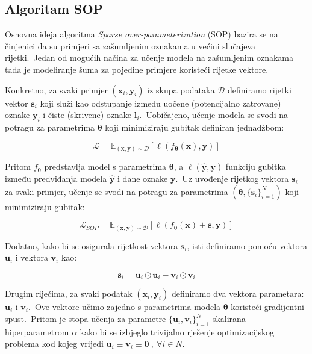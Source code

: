 \documentclass[diplomskirad]{fer}
\begin{document}
\subsection{Algoritam SOP}
\label{sub:sop}

Osnovna ideja algoritma \textit{Sparse over-parameterization} (SOP) bazira se na činjenici da su primjeri sa zašumljenim oznakama u većini slučajeva rijetki.\ 
Jedan od mogućih načina za učenje modela na zašumljenim oznakama tada je modeliranje šuma za pojedine primjere koristeći rijetke vektore.\ 

Konkretno, za svaki primjer $(\bm{x}_i, \bm{y}_i)$ iz skupa podataka $\mathcal{D}$ definiramo rijetki vektor $\bm{s}_i$ koji služi kao odstupanje između uočene (potencijalno zatrovane) oznake $\bm{y}_i$ i čiste (skrivene) oznake $\bm{l}_i$.\ 
Uobičajeno, učenje modela se svodi na potragu za parametrima $\bm{\theta}$ koji minimiziraju gubitak definiran jednadžbom:

\begin{equation}
  \mathcal{L} = \mathbb{E}_{(\bm{x}, \bm{y}) \sim \mathcal{D}} \left[ \ell(f_{\bm{\theta}}(\bm{x}), \bm{y}) \right]
  \label{eq:sop1}
\end{equation}

Pritom $f_{\bm{\theta}}$ predstavlja model s parametrima $\bm{\theta}$, a $\ell(\bm{\hat{y}}, \bm{y})$ funkciju gubitka između predviđanja modela $\bm{\hat{y}}$ i dane oznake $\bm{y}$.\ 
Uz uvođenje rijetkog vektora $\bm{s}_i$ za svaki primjer, učenje se svodi na potragu za parametrima $(\bm{\theta}, \{\bm{s}_i\}_{i=1}^N)$ koji minimiziraju gubitak:

\begin{equation}
  \mathcal{L}_{SOP} = \mathbb{E}_{(\bm{x}, \bm{y}) \sim \mathcal{D}} \left[ \ell(f_{\bm{\theta}}(\bm{x}) + \bm{s}, \bm{y}) \right]
  \label{eq:sop2}
\end{equation}

Dodatno, kako bi se osigurala rijetkost vektora $\bm{s}_i$, isti definiramo pomoću vektora $\bm{u}_i$ i vektora $\bm{v}_i$ kao:

\begin{equation}
  \bm{s}_i = \bm{u}_i \odot \bm{u}_i - \bm{v}_i \odot \bm{v}_i
  \label{eq:sop_s1}
\end{equation}

Drugim riječima, za svaki podatak $(\bm{x}_i, \bm{y}_i)$ definiramo dva vektora parametara: $\bm{u}_i$ i $\bm{v}_i$.\ 
Ove vektore učimo zajedno s parametrima modela $\bm{\theta}$ koristeći gradijentni spust.\ 
Pritom je stopa učenja za parametre $\{\bm{u}_i,\bm{v}_i\}_{i=1}^N$ skalirana hiperparametrom $\alpha$ kako bi se izbjeglo trivijalno rješenje optimizacijskog problema kod kojeg vrijedi $\bm{u}_i \equiv \bm{v}_i \equiv \bm{0}\:,\:\forall i \in N$.\ 
\end{document}
